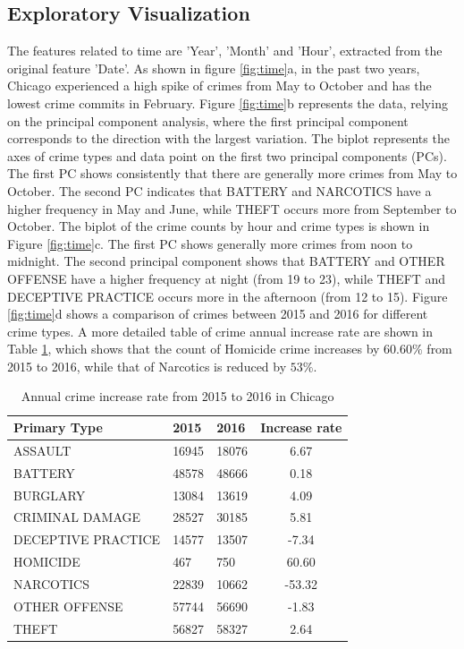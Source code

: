 \documentclass[12pt]{article}
\begin{document}
\subsection{Exploratory Visualization}
The features related to time are 'Year', 'Month' and 'Hour', extracted from the original feature 'Date'. As shown in figure \ref{fig:time}a, in the past two years, Chicago experienced a high spike of crimes from May to October and has the lowest crime commits in February. Figure \ref{fig:time}b represents the data, relying on the principal component analysis, where the first principal component corresponds to the direction with the largest variation. The biplot represents the axes of crime types and data point on the first two principal components (PCs). The first PC shows consistently that there are generally more crimes from May to October. The second PC indicates that BATTERY and NARCOTICS have a higher frequency in May and June, while THEFT occurs more from September to October. The biplot of the crime counts by hour and crime types is shown in Figure \ref{fig:time}c. The first PC shows generally more crimes from noon to midnight. The second principal component shows that BATTERY and OTHER OFFENSE have a higher frequency at night (from 19 to 23), while THEFT and DECEPTIVE PRACTICE occurs more in the afternoon (from 12 to 15). Figure \ref{fig:time}d shows a comparison of crimes between 2015 and 2016 for different crime types. A more detailed table of crime annual increase rate are shown in Table \ref{tab:year}, which shows that the count of Homicide crime increases by $60.60\%$ from 2015 to 2016, while that of Narcotics is reduced by $53\%$.  

\begin{table}
\caption{Annual crime increase rate from 2015 to 2016 in Chicago} 
\label{tab:year} 
\begin{center}
\begin{tabular}{l|p{2.5cm}|p{2.5cm}|c}
\hline
\textbf{Primary Type}&	\textbf{2015}&	\textbf{2016}	&	\textbf{Increase rate}\\
\hline		
ASSAULT&			16945&	18076&	6.67\\
BATTERY&			48578&	48666&	0.18\\
BURGLARY&		13084&	13619&	4.09\\
CRIMINAL DAMAGE&	28527&	30185&	5.81\\
DECEPTIVE PRACTICE&	14577&	13507&	-7.34\\
HOMICIDE&		467&		750&		60.60\\
NARCOTICS&		22839&	10662&	-53.32\\
OTHER OFFENSE&	57744&	56690&	-1.83\\
THEFT&			56827&	58327&	2.64\\
\hline
\end{tabular}
\end{center}
\end{table}
\end{document}
